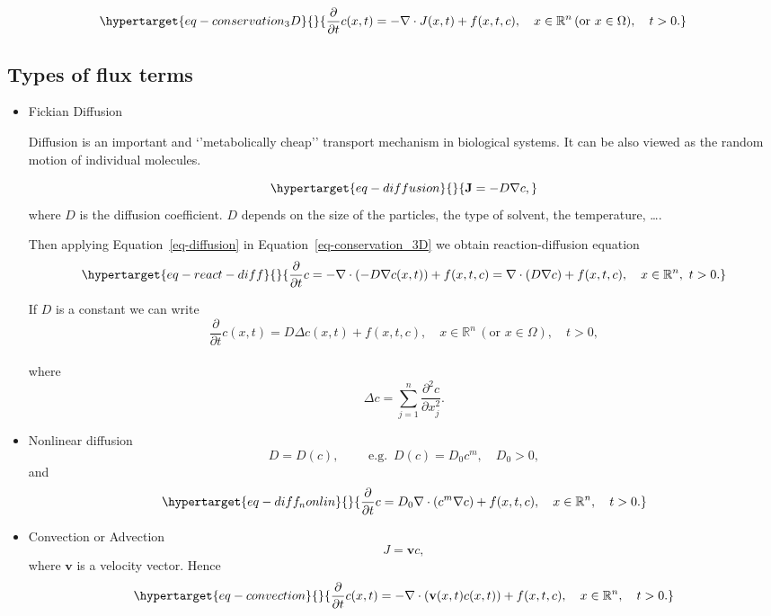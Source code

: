 \documentclass[
  letterpaper,
  DIV=11,
  numbers=noendperiod]{scrreprt}
\theoremstyle{definition}
\theoremstyle{plain}
\theoremstyle{plain}
\theoremstyle{remark}
\begin{document}
\begin{equation}\protect\hypertarget{eq-conservation_3D}{}{
\frac{\partial}{\partial t} c(x,t) =  - \nabla \cdot  J(x,t)+  f(x,t ,c), \quad x\in \mathbb R^n \,  (\text{or } x \in \Omega), \quad t >0. 
}\label{eq-conservation_3D}\end{equation}

\hypertarget{types-of-flux-terms}{%
\subsection{Types of flux terms}\label{types-of-flux-terms}}

\begin{itemize}
\item
  Fickian Diffusion

  Diffusion is an important and `'metabolically cheap'' transport
  mechanism in biological systems. It can be also viewed as the random
  motion of individual molecules.

  \begin{equation}\protect\hypertarget{eq-diffusion}{}{
  {\mathbf{J}} = - D\nabla c,
  }\label{eq-diffusion}\end{equation} where \(D\) is the diffusion
  coefficient. \(D\) depends on the size of the particles, the type of
  solvent, the temperature, \ldots.

  Then applying Equation~\ref{eq-diffusion} in
  Equation~\ref{eq-conservation_3D} we obtain reaction-diffusion
  equation \begin{equation}\protect\hypertarget{eq-react-diff}{}{
  \frac{\partial}{\partial t} c =  - \nabla\cdot ( - D \nabla c(x,t))+  f(x,t ,c) = \nabla \cdot ( D \nabla c) + f(x,t ,c),
  \quad x\in \mathbb R^n, \,  \, t >0.
  }\label{eq-react-diff}\end{equation}

  If \(D\) is a constant we can write \[
  \frac{\partial}{\partial t} c(x,t) =  D \Delta c(x,t) + f(x,t ,c),
  \quad x\in \mathbb R^n \,  (\text{or } x \in \Omega), \quad t >0, 
  \]\\
  where \[
  \Delta c = \sum\limits_{j=1}^n \dfrac{\partial^2 c}{\partial x_j^2}.
  \]
\item
  Nonlinear diffusion \[
  D = D(c) , \qquad \text{ e.g. }\,   D(c)= D_0 c^m, \quad D_0 >0, 
  \] and \begin{equation}\protect\hypertarget{eq-diff_nonlin}{}{
    \frac{\partial}{\partial t} c = D_0 \nabla\cdot (c^m \nabla c) + f(x,t ,c),
  \quad x\in \mathbb R^n,  \quad t >0.
  }\label{eq-diff_nonlin}\end{equation}
\item
  Convection or Advection \[ 
  J = \textbf{v} c,
  \] where \(\textbf{v}\) is a velocity vector. Hence
  \begin{equation}\protect\hypertarget{eq-convection}{}{
  \frac{\partial}{\partial t} c(x,t) = - \nabla\cdot (\textbf{v}(x,t) c(x,t))  + f(x,t ,c),
  \quad x\in \mathbb R^n,   \quad t >0. 
  }\label{eq-convection}\end{equation}


\end{itemize}
\end{document}
